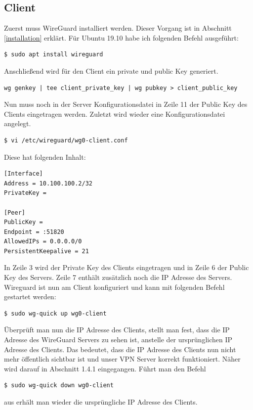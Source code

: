 \subsection{Client}
Zuerst muss WireGuard installiert werden. Dieser Vorgang ist in Abschnitt \ref{installation} erklärt. Für Ubuntu 19.10 habe ich folgenden Befehl ausgeführt:
\begin{lstlisting}
$ sudo apt install wireguard
\end{lstlisting} 
 Anschließend wird für den Client ein private und public Key generiert.
\begin{lstlisting}
wg genkey | tee client_private_key | wg pubkey > client_public_key
\end{lstlisting}
Nun muss noch in der Server Konfigurationsdatei in Zeile 11 der Public Key des Clients eingetragen werden. \newline\newline
Zuletzt wird wieder eine Konfigurationsdatei angelegt.
\begin{lstlisting}
$ vi /etc/wireguard/wg0-client.conf
\end{lstlisting}
Diese hat folgenden Inhalt:
\begin{lstlisting}
[Interface]
Address = 10.100.100.2/32
PrivateKey =

[Peer]
PublicKey =
Endpoint = :51820
AllowedIPs = 0.0.0.0/0
PersistentKeepalive = 21
\end{lstlisting}
In Zeile 3 wird der Private Key des Clients eingetragen und in Zeile 6 der Public Key des Servers. Zeile 7 enthält zusätzlich noch die IP Adresse des Servers. \newline
Wireguard ist nun am Client konfiguriert und kann mit folgenden Befehl gestartet werden:
\begin{lstlisting}
$ sudo wg-quick up wg0-client
\end{lstlisting}
Überprüft man nun die IP Adresse des Clients, stellt man fest, dass die IP Adresse des WireGuard Servers zu sehen ist, anstelle der ursprünglichen IP Adresse des Clients. Das bedeutet, dass die IP Adresse des Clients nun nicht mehr öffentlich sichtbar ist und unser VPN Server korrekt funktioniert. Näher wird darauf in Abschnitt 1.4.1 eingegangen. \newline \newline
Führt man den Befehl
\begin{lstlisting}
$ sudo wg-quick down wg0-client
\end{lstlisting}
aus erhält man wieder die ursprüngliche IP Adresse des Clients.
\newpage

